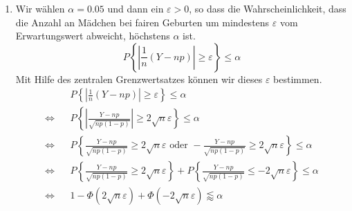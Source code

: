 \documentclass[a4paper]{scrartcl}
\newcommand{\gdw}{\Leftrightarrow}
\begin{document}
\begin{enumerate}[label=\bfseries\arabic*.]
\begin{enumerate}[label=(\alph*)]
            \item
                Wir wählen $\alpha = \num{0,05}$ und dann ein $\varepsilon > 0$,
                so dass die Wahrscheinlichkeit, dass die Anzahl an Mädchen bei
                fairen Geburten um mindestens $\varepsilon$ vom Erwartungswert
                abweicht, höchstens $\alpha$ ist.
                \begin{equation*}
                    P \left\{
                        \left| \frac{1}{n} (Y - np) \right| \geq \varepsilon
                    \right\} \leq \alpha
                \end{equation*}
                Mit Hilfe des zentralen Grenzwertsatzes können wir dieses
                $\varepsilon$ bestimmen.
                \begin{equation*}
                    \begin{alignedat}{2}
                        && P \left\{
                            \left| \frac{1}{n} (Y - np) \right| \geq \varepsilon
                        \right\} 
                        \leq \alpha \\
                        \gdw&& P \left\{
                            \left| \frac{Y - np}{\sqrt{np(1-p)}} \right|
                            \geq 2 \sqrt{n} \varepsilon
                        \right\} 
                        \leq \alpha \\
                        \gdw&& P \left\{
                            \frac{Y - np}{\sqrt{np(1-p)}}
                            \geq 2 \sqrt{n} \varepsilon
                            \text{ oder }
                            -\frac{Y - np}{\sqrt{np(1-p)}}
                            \geq 2 \sqrt{n} \varepsilon
                        \right\} 
                        \leq \alpha \\
                        \gdw&& P \left\{
                            \frac{Y - np}{\sqrt{np(1-p)}}
                            \geq 2 \sqrt{n} \varepsilon
                        \right\} 
                        +
                        P \left\{
                            \frac{Y - np}{\sqrt{np(1-p)}}
                            \leq -2 \sqrt{n} \varepsilon
                        \right\} 
                        \leq \alpha \\
                        \gdw&&
                        1 - \Phi(2 \sqrt{n} \varepsilon)
                        +
                        \Phi(-2 \sqrt{n} \varepsilon)
                        \lessapprox \alpha \\

\end{alignedat}
\end{equation*}
\end{enumerate}
\end{enumerate}
\end{document}
